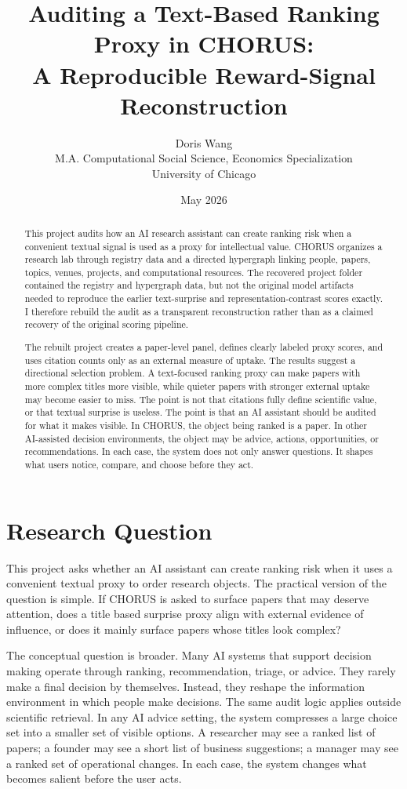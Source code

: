 \documentclass[11pt]{article}
\title{\vspace{-1.3cm}Auditing a Text-Based Ranking Proxy in CHORUS:\\
A Reproducible Reward-Signal Reconstruction}
\author{Doris Wang\\
M.A. Computational Social Science, Economics Specialization\\
University of Chicago}
\date{May 2026}
\begin{document}
\maketitle

\begin{abstract}
This project audits how an AI research assistant can create ranking risk when a convenient textual signal is used as a proxy for intellectual value. CHORUS organizes a research lab through registry data and a directed hypergraph linking people, papers, topics, venues, projects, and computational resources. The recovered project folder contained the registry and hypergraph data, but not the original model artifacts needed to reproduce the earlier text-surprise and representation-contrast scores exactly. I therefore rebuild the audit as a transparent reconstruction rather than as a claimed recovery of the original scoring pipeline.

The rebuilt project creates a paper-level panel, defines clearly labeled proxy scores, and uses citation counts only as an external measure of uptake. The results suggest a directional selection problem. A text-focused ranking proxy can make papers with more complex titles more visible, while quieter papers with stronger external uptake may become easier to miss. The point is not that citations fully define scientific value, or that textual surprise is useless. The point is that an AI assistant should be audited for what it makes visible. In CHORUS, the object being ranked is a paper. In other AI-assisted decision environments, the object may be advice, actions, opportunities, or recommendations. In each case, the system does not only answer questions. It shapes what users notice, compare, and choose before they act.
\end{abstract}

\section{Research Question}

This project asks whether an AI assistant can create ranking risk when it uses
a convenient textual proxy to order research objects. The practical version of
the question is simple. If CHORUS is asked to surface papers that may deserve
attention, does a title based surprise proxy align with external evidence of
influence, or does it mainly surface papers whose titles look complex?

The conceptual question is broader. Many AI systems that support decision
making operate through ranking, recommendation, triage, or advice. They rarely
make a final decision by themselves. Instead, they reshape the information
environment in which people make decisions. The same audit logic applies
outside scientific retrieval. In any AI advice setting, the system compresses a
large choice set into a smaller set of visible options. A researcher may see a
ranked list of papers; a founder may see a short list of business suggestions;
a manager may see a ranked set of operational changes. In each case, the system
changes what becomes salient before the user acts.
\end{document}
